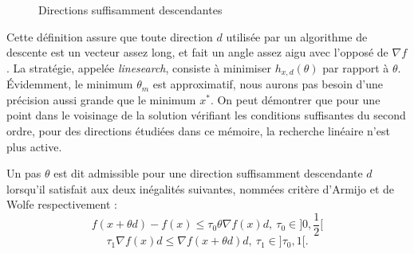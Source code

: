 



\begin{figure}
\caption{Directions suffisamment descendantes}
\begin{center}
  \endpgfgraphicnamed
\end{center}
\end{figure}
\noindent
Cette d\'efinition assure que toute direction $d$ utilis\'ee par un algorithme de descente est un vecteur assez long, et fait un angle assez
aigu avec l'oppos\'e de $\nabla f$. La strat\'egie, appel\'ee {\it linesearch}, consiste \`a minimiser $h_{x,d}(\theta)$ par rapport \`a $\theta$. %
\'Evidemment, le minimum $\theta_m$ est approximatif, nous aurons pas besoin d'une pr\'ecision aussi grande que le minimum $x^*$. 
On peut d\'emontrer que pour une point dans le voisinage de la solution v\'erifiant les conditions suffisantes du 
second ordre, pour des directions \'etudi\'ees dans ce m\'emoire, la recherche lin\'eaire n'est plus active.






\begin{frdefinition}
\label{def:3}
Un pas $\theta$ est dit admissible pour une direction suffisamment descendante $d$ lorsqu'il satisfait aux deux in\'egalit\'es suivantes, nomm\'ees
 crit\`ere d'Armijo et de Wolfe respectivement :
\begin{equation}
\label{equ:3}
f(x+\theta d)-f(x) \leq \tau_0 \theta \nabla f(x)d, \ \tau_0 \in ]0,\frac{1}{2}[
\tag{Armijo}
\end{equation}
\begin{equation}
\label{equ:4}
\tau_1 \nabla f(x)d \leq  \nabla f(x+\theta d)d , \ \tau_1 \in ]\tau_0,1[.
\tag{Wolfe}
\end{equation}
 


\end{frdefinition}

